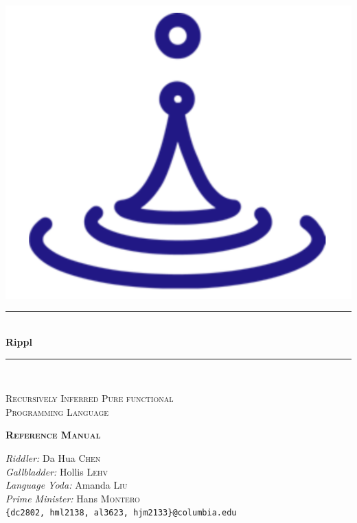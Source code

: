 \documentclass[5pt]{article}
\begin{document}
\begin{titlepage}

\newcommand{\HRule}{\rule{\linewidth}{0.5mm}} %
\begin{center}
\includegraphics[scale=.4]{rippl.png}
\end{center}
\begin{center}
\HRule \\[0.4cm]
{ \Huge \bfseries Rippl }\\[0.2cm]
\HRule \\[0.2cm]
\end{center}
 \begin{center} \textsc{\LARGE  Recursively Inferred Pure functional \\Programming Language  \\ } \end{center}
 \begin{center} \textbf{\textsc{\LARGE Reference Manual } }\\[1.5cm] \end{center}
\begin{center}
\large \emph{Riddler:}
Da Hua \textsc{Chen}\\
\large \emph{Gallbladder:}
Hollis \textsc{Lehv}\\
\large \emph{Language Yoda:}
Amanda \textsc{Liu}\\ 
\large \emph{Prime Minister:}
Hans \textsc{Montero}\\
\texttt{\{dc2802, hml2138, al3623, hjm2133\}@columbia.edu}
\end{center}

\vfill 
\end{titlepage}
\end{document}
